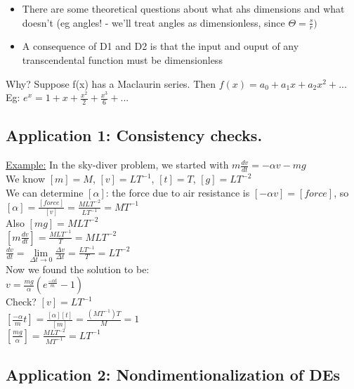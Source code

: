 \documentclass[12pt]{article}
\begin{document}
	\begin{itemize}
		\item There are some theoretical questions about what ahs dimensions and what doesn't (eg angles! - we'll treat angles as dimensionless, since $\Theta = \frac{s}{r})$
		\item A consequence of D1 and D2 is that the input and ouput of any transcendental function must be dimensionless
	\end{itemize}

	Why? Suppose f(x) has a Maclaurin series. Then $f(x) = a_0 + a_1x + a_2x^2 + ... $\\
	
	Eg: $e^x = 1 + x + \frac{x^2}{2} + \frac{x^3}{6} + ...$\\
	
	\subsection*{Application 1: Consistency checks.}
	
	\underline{Example:} In the sky-diver problem, we started with $m\frac{dv}{dt} = -\alpha v-mg$\\
	
	We know $[m] = M$, $[v] = LT^{-1}$, $[t] = T$, $[g] = LT^{-2}$\\
	We can determine $[\alpha]$: the force due to air resistance is $[-\alpha v] = [force]$, so $[\alpha] = \frac{[force]}{[v]} = \frac{MLT^{-2}}{LT^{-1}} = MT^{-1}$\\
	Also $[mg] = MLT^{-2}$\\
	$[m\frac{dv}{dt}] = \frac{MLT^{-1}}{T} = MLT^{-2}$\\
	
	$\frac{dv}{dt} = \lim\limits_{\Delta t \rightarrow 0}\frac{\Delta v}{\Delta t} = \frac{LT^{-1}}{T} = LT^{-2}$\\
	
	Now we found the solution to be:\\
	$v = \frac{mg}{\alpha}(e^{\frac{-\alpha t}{m}} - 1)$\\
	Check? $[v] = LT^{-1}$\\
	$[\frac{-\alpha}{m}t] = \frac{[\alpha][t]}{[m]} = \frac{(MT^{-1})T}{M} = 1$\\
	$[\frac{mg}{\alpha}] = \frac{MLT^{-2}}{MT^{-1}} = LT^{-1}$\\
	
	\subsection*{Application 2: Nondimentionalization of DEs}
	
\end{document}
